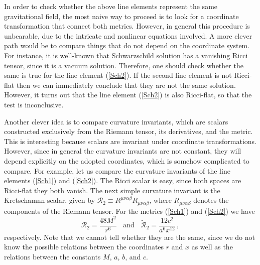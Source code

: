 \documentclass[twocolumn,prd,aps,showpacs,showkeys,amsmath,amssymb]{revtex4-1}
\begin{document}
In order to check whether the above line elements represent the same gravitational field, the most naive way to proceed is to look for a coordinate transformation that connect both metrics. However, in general this procedure is unbearable, due to the intricate and nonlinear equations involved. A more clever path would be to compare things that do not depend on the coordinate system. For instance, it is well-known that Schwarzschild solution has a vanishing Ricci tensor, since it is a vacuum solution. Therefore, one should check whether the same is true for the line element (\ref{Sch2}). If the second line element is not Ricci-flat then we can immediately conclude that they are not the same solution. However, it turns out that the line element (\ref{Sch2}) is also Ricci-flat, so that the test is inconclusive.



Another clever idea is to compare curvature invariants, which are scalars constructed exclusively from the Riemann tensor, its derivatives, and the metric. This is interesting because scalars are invariant under coordinate transformations. However, since in general the curvature invariants are not constant, they will depend explicitly on the adopted coordinates, which is somehow complicated to compare. For example, let us compare the curvature invariants of the line elements (\ref{Sch1}) and (\ref{Sch2}). The Ricci scalar is easy, since both spaces are Ricci-flat they both vanish. The next simple curvature invariant is the Kretschamnn scalar, given by $\mathcal{R}_2\equiv R^{\mu\nu\alpha\beta}R_{\mu\nu\alpha\beta}$, where $R_{\mu\nu\alpha\beta}$ denotes the components of the Riemann tensor. For the metrics (\ref{Sch1}) and (\ref{Sch2}) we have
\begin{equation*}
   \mathcal{R}_2 =  \frac{48M^2}{r^6}  \;\; \textrm{ and } \;\;
 \tilde{\mathcal{R}}_2 =\frac{12c^2}{a^6 x^{12}} \,,
\end{equation*}
respectively. Note that we cannot tell whether they are the same, since we do not know the possible relations between the coordinates $r$ and $x$ as well as the relations between the constants $M$, $a$, $b$, and $c$.
\end{document}
